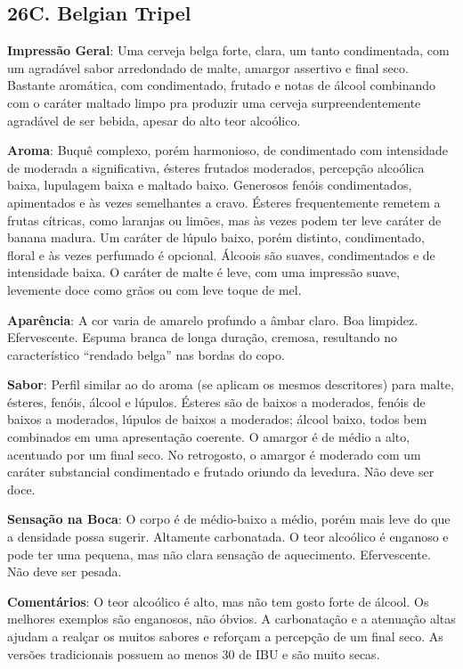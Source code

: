 \subsection*{26C. Belgian Tripel}
\textbf{Impressão Geral}: Uma cerveja belga forte, clara, um tanto condimentada, com um agradável sabor arredondado de malte, amargor assertivo e final seco. Bastante aromática, com condimentado, frutado e notas de álcool combinando com o caráter maltado limpo pra produzir uma cerveja surpreendentemente agradável de ser bebida, apesar do alto teor alcoólico.

\textbf{Aroma}: Buquê complexo, porém harmonioso, de condimentado com intensidade de moderada a significativa, ésteres frutados moderados, percepção alcoólica baixa, lupulagem baixa e maltado baixo. Generosos fenóis condimentados, apimentados e às vezes semelhantes a cravo. Ésteres frequentemente remetem a frutas cítricas, como laranjas ou limões, mas às vezes podem ter leve caráter de banana madura. Um caráter de lúpulo baixo, porém distinto, condimentado, floral e às vezes perfumado é opcional. Álcoois são suaves, condimentados e de intensidade baixa. O caráter de malte é leve, com uma impressão suave, levemente doce como grãos ou com leve toque de mel.

\textbf{Aparência}: A cor varia de amarelo profundo a âmbar claro. Boa limpidez. Efervescente. Espuma branca de longa duração, cremosa, resultando no característico “rendado belga” nas bordas do copo.

\textbf{Sabor}: Perfil similar ao do aroma (se aplicam os mesmos descritores) para malte, ésteres, fenóis, álcool e lúpulos. Ésteres são de baixos a moderados, fenóis de baixos a moderados, lúpulos de baixos a moderados; álcool baixo, todos bem combinados em uma apresentação coerente. O amargor é de médio a alto, acentuado por um final seco. No retrogosto, o amargor é moderado com um caráter substancial condimentado e frutado oriundo da levedura. Não deve ser doce.

\textbf{Sensação na Boca}: O corpo é de médio-baixo a médio, porém mais leve do que a densidade possa sugerir. Altamente carbonatada. O teor alcoólico é enganoso e pode ter uma pequena, mas não clara sensação de aquecimento. Efervescente. Não deve ser pesada.

\textbf{Comentários}: O teor alcoólico é alto, mas não tem gosto forte de álcool. Os melhores exemplos são enganosos, não óbvios. A carbonatação e a atenuação altas ajudam a realçar os muitos sabores e reforçam a percepção de um final seco. As versões tradicionais possuem ao menos 30 de IBU e são muito secas.

